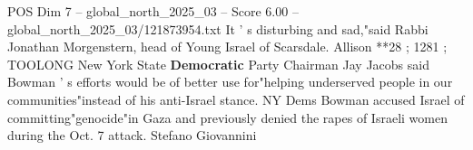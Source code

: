 \begin{textsample}{POS Dim 7 – global\_north\_2025\_03 – Score 6.00 – global\_north\_2025\_03/121873954.txt}
It ' s disturbing and sad,"said Rabbi Jonathan Morgenstern, head of Young Israel of Scarsdale.
Allison **28 ; 1281 ; TOOLONG New York State \textbf{Democratic} Party Chairman Jay Jacobs said Bowman ' s efforts would be of better use for"helping underserved people in our communities"instead of his anti-Israel stance.
NY Dems Bowman accused Israel of committing"genocide"in Gaza and previously denied the rapes of Israeli women during the Oct. 7 attack.
Stefano Giovannini

\end{textsample}

